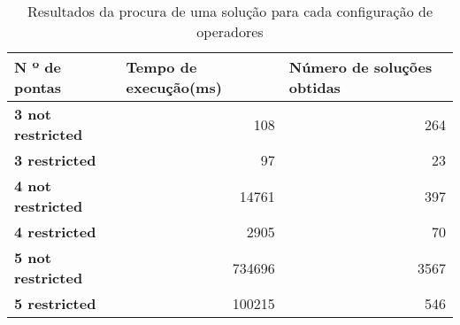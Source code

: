 \begin{table}[htbp]
  \centering
  \caption{Resultados da procura de uma solução para cada configuração de operadores}
    \begin{tabular}{lrr}\hline
    \textbf{N º de pontas}  &
    \multicolumn{1}{l}{\textbf{Tempo de execução(ms)}} & \multicolumn{1}{l}{\textbf{Número de soluções obtidas}} \\\hline
    \textbf{3 not restricted} & 108   & 264 \\
    \textbf{3 restricted} & 97    & 23 \\
    \textbf{4 not restricted} & 14761 & 397 \\
    \textbf{4 restricted} & 2905  & 70 \\
    \textbf{5 not restricted} & 734696 & 3567 \\
    \textbf{5 restricted} & 100215 & 546 \\\hline
    \end{tabular}%
  \label{tab:onesolution_per_configuration}%
\end{table}%